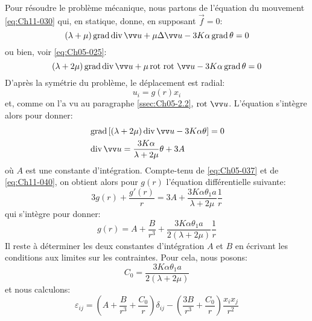 Pour résoudre le problème mécanique, nous partons de l'équation du mouvement \eqref{eq:Ch11-030} qui, en statique, donne, en supposant $\vec{f}=0$: 
\begin{equation}
    (\lambda+\mu) \grad \dive \vec{u} + \mu \Delta \vec{u} - 3K\alpha \grad \theta = 0
\end{equation}
ou bien, voir \eqref{eq:Ch05-025}: 
\begin{equation}
    (\lambda+2\mu) \grad \dive \vec{u} + \mu \rot \rot \vec{u} - 3K\alpha \grad \theta = 0
    \label{eq:Ch11-041}
\end{equation}
D'après la symétrie du problème, le déplacement est radial: 
\begin{equation}
    u_i=g(r) x_i
    \label{eq:Ch11-042}
\end{equation}
et, comme on l'a vu au paragraphe \ref{ssec:Ch05-2.2}, $\rot \vec{u}$. L'équation s'intègre alors pour donner: 
\begin{subequations} 
\begin{align}
&\grad\left[(\lambda + 2 \mu) \dive \vec{u} - 3 K \alpha \theta \right] = 0\\
&    \dive \vec{u} = \frac{3K\alpha}{\lambda + 2 \mu} \theta + 3 A
    \label{eq:Ch11-043}
\end{align}
\end{subequations}
où $A$ est une constante d'intégration.
Compte-tenu de \eqref{eq:Ch05-037} et de \eqref{eq:Ch11-040}, on obtient alors pour $g(r)$ l'équation différentielle suivante: 
\begin{equation}
    3g(r)+\frac{g'(r)}{r} = 3A + \frac{3K\alpha\theta_1 a}{\lambda + 2 \mu}\frac{1}{r}
    \label{eq:Ch11-044}
\end{equation}
qui s'intègre pour donner: 
\begin{equation}
    g(r) = A + \frac{B}{r^3}+\frac{3K\alpha\theta_1 a}{2(\lambda + 2\mu)}\frac{1}{r}
    \label{eq:Ch11-045}
\end{equation}
Il reste à déterminer les deux constantes d'intégration $A$ et $B$ en écrivant les conditions aux limites sur les contraintes.
Pour cela, nous posons: 
\begin{equation}
    C_0 = \frac{3K\alpha\theta_1 a}{2(\lambda + 2\mu)}
    \label{eq:Ch11-046}
\end{equation}
et nous calculons: 
\begin{equation}
    \varepsilon_{ij}=\left(A+\frac{B}{r^3}+\frac{C_0}{r}\right)\delta_{ij}-\left(\frac{3B}{r^3}+\frac{C_0}{r}\right)\frac{x_ix_j}{r^2}
    \label{eq:Ch11-047}
\end{equation}
